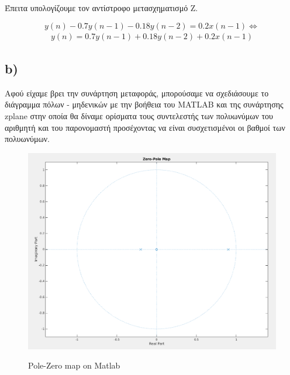 \documentclass[11pt]{article}
\begin{document}
\par \noindent
Έπειτα υπολογίζουμε τον αντίστροφο μετασχηματισμό Z. %

\[ y(n) - 0.7y(n-1) -0.18y(n-2) = 0.2x(n-1) \Leftrightarrow \]
\begin{align}
    \boxed{y(n) = 0.7y(n-1) + 0.18y(n-2) + 0.2x(n-1)}
\end{align}

\subsection*{b)}
Αφού είχαμε βρει την συνάρτηση μεταφοράς, μπορούσαμε να σχεδιάσουμε το διάγραμμα πόλων - μηδενικών με την βοήθεια του MATLAB και της συνάρτησης zplane στην οποία θα δίναμε ορίσματα τους συντελεστής των πολυωνύμων του αριθμητή και του παρονομαστή προσέχοντας να είναι συσχετισμένοι οι βαθμοί των πολυωνύμων.

\begin{figure}[H]
    \centering
    \includegraphics[scale=0.35]{photos/Zero_Pole_Map.png}\\
    \caption{Pole-Zero map on Matlab}
\end{figure}

\end{document}

